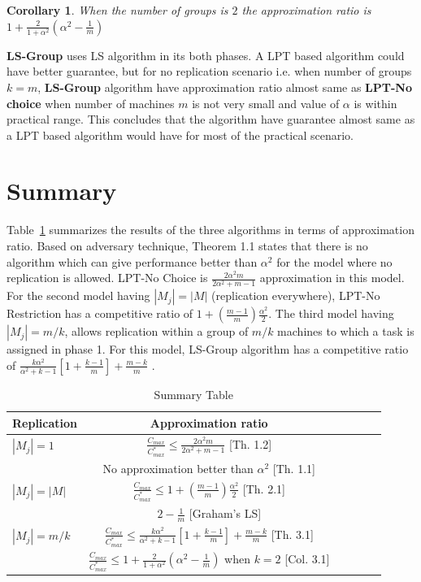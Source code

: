 \documentclass[10pt, conference, compsocconf]{IEEEtran}
\newtheorem{corollary}{Corollary}[theorem]
\begin{document}
\begin{corollary}
 When the number of groups is $2$ the approximation ratio is $ 1+ \frac{2}{1+\alpha^{2}} (\alpha^2-\frac{1}{m})  $ 
\end{corollary}

 \textbf{LS-Group} uses LS algorithm in its both phases. A LPT based algorithm could have better guarantee, but for no replication scenario i.e. when number of groups $k=m$, \textbf{LS-Group} algorithm have approximation ratio almost same as \textbf{LPT-No choice} when number of machines $m$ is not very small and value of $\alpha$ is within practical range. This concludes that the algorithm have guarantee almost same as a LPT based algorithm would have for most of the practical scenario.

\section{Summary}
 Table~\ref{tab:template} summarizes the results of the three algorithms in terms of approximation ratio. Based on
adversary technique, Theorem 1.1 states that there is no algorithm which can give performance better than $\alpha^2$ for the model where no replication is allowed.  LPT-No Choice is $\frac{2\alpha^{2}m}{2\alpha^{2}+ m-1}$ approximation  in this model. For the second model having $|M_j| = |M|$ (replication everywhere), LPT-No Restriction has a competitive ratio of $1 + (\frac{m-1}{m})\frac{\alpha^{2}}{2}$.  The third model having $|M_j| = m/k$, allows replication within a group of $m/k$ machines to which a task is assigned in phase 1. For this model, LS-Group algorithm has a competitive ratio of $\frac{k\alpha^{2}}{\alpha^{2}+k-1}\left[1+ {\frac{k-1}{m}} \right]+ {\frac{m-k}{m}}$ .



\begin{table}[ht]
\centering
\begin{tabular}{|l|c|c|c|c|c|}
\hline
Replication & Approximation ratio  \\
\hline
$|M_j|=1$ & $\frac{C_{max}}{C_{max}^{*}}\leq \frac{2\alpha^{2}m}{2\alpha^{2}+ m-1}$ [Th. 1.2]  \\
 & No approximation better than $\alpha^2$ [Th. 1.1]   \\

\hline
$|M_j|=|M|$ & $\frac{C_{max}}{C_{max}^{*}} \leq 1 + (\frac{m-1}{m})\frac{\alpha^{2}}{2}$ [Th. 2.1]  \\
 & $2-\frac{1}{m}$ [Graham's LS]   \\
 \hline
 
 $|M_j|= m/k $ & $\frac{C_{max}}{C_{max}^{*}} \leq \frac{k\alpha^{2}}{\alpha^{2}+k-1}\left[1+ {\frac{k-1}{m}} \right]+ {\frac{m-k}{m}}$ [Th. 3.1]  \\
  & $\frac{C_{max}}{C_{max}^{*}} \leq  1+ \frac{2}{1+\alpha^{2}} \left(\alpha^2-\frac{1}{m}\right)$ when $k=2$ [Col. 3.1]   \\
  
  \hline
 \end{tabular}
\caption{Summary Table}
\label{tab:template}
\end{table}
\end{document}
